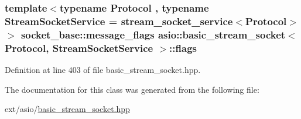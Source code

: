 \subsubsection[{flags}]{\setlength{\rightskip}{0pt plus 5cm}template$<$typename Protocol , typename Stream\+Socket\+Service  = stream\+\_\+socket\+\_\+service$<$\+Protocol$>$$>$ {\bf socket\+\_\+base\+::message\+\_\+flags} {\bf asio\+::basic\+\_\+stream\+\_\+socket}$<$ Protocol, Stream\+Socket\+Service $>$\+::flags}\label{classasio_1_1basic__stream__socket_a49da9b10ef73407f4991c633ced27111}


Definition at line 403 of file basic\+\_\+stream\+\_\+socket.\+hpp.



The documentation for this class was generated from the following file\+:\begin{DoxyCompactItemize}
\item 
ext/asio/\hyperlink{basic__stream__socket_8hpp}{basic\+\_\+stream\+\_\+socket.\+hpp}\end{DoxyCompactItemize}

